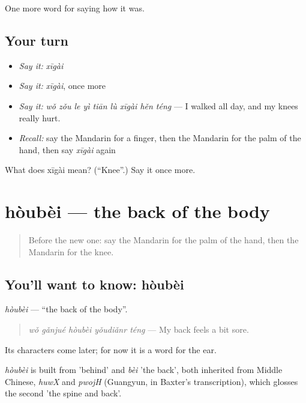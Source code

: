 \begin{grammarlens}[title={What you've built}]
One more word for saying how it was.
\end{grammarlens}

\subsection*{Your turn}
\begin{itemize}
\raggedright
  \item \emph{Say it:} \emph{xīgài}
  \item \emph{Say it:} \emph{xīgài}, once more
  \item \emph{Say it:} \emph{wǒ zǒu le yì tiān lù xīgài hěn téng} — I walked all day, and my knees really hurt.
  \item \emph{Recall:} say the Mandarin for a finger, then the Mandarin for the palm of the hand, then say \emph{xīgài} again
\end{itemize}

\begin{tcolorbox}[breakable,colback=teal!4,colframe=teal!35!black,title={Before you move on}]
What does xīgài mean? (\textquotedblleft{}Knee\textquotedblright{}.) Say it once more.
\end{tcolorbox}
\section[hòubèi]{hòubèi — the back of the body}

\label{lesson:ZH-C475-houbei}



\begin{quote}
Before the new one: say the Mandarin for the palm of the hand, then the Mandarin for the knee.
\end{quote}

\subsection*{You'll want to know: hòubèi}
\emph{hòubèi} — \textquotedblleft{}the back of the body\textquotedblright{}.

\begin{quote}
\emph{wǒ gǎnjué hòubèi yǒudiǎnr téng} — My back feels a bit sore.
\end{quote}

Its characters come later; for now it is a word for the ear.

\begin{cousinweb}
\emph{hòubèi} is built from  'behind' and \emph{bèi} 'the back', both inherited from Middle Chinese, \emph{huwX} and \emph{pwojH} (Guangyun, in Baxter's transcription), which glosses the second 'the spine and back'.
\end{cousinweb}

